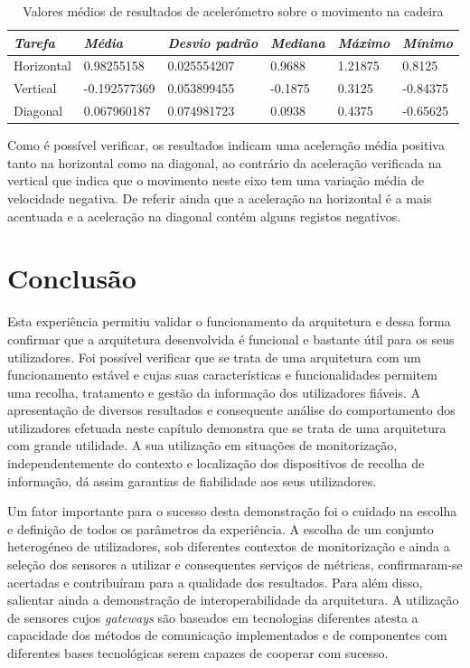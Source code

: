 {\renewcommand{\arraystretch}{1.0}
\begin{table}[!htb]
\centering
\label{tab:a_tbk}
\vspace{2pt}
\begin{tabular}{ | l | l | l | l | l | l |  }
\hline
\textit{Tarefa}&\textit{Média}&\textit{Desvio padrão}&\textit{Mediana} & \textit{Máximo} & \textit{Mínimo}\\  
\hline
Horizontal&0.98255158&0.025554207&0.9688&1.21875&0.8125 \\
Vertical&-0.192577369&0.053899455&-0.1875&0.3125&-0.84375 \\
Diagonal&0.067960187&0.074981723&0.0938&0.4375&-0.65625 \\
\hline
\end{tabular}
\caption{Valores médios de resultados de acelerómetro sobre o movimento na cadeira} 
\end{table}}

Como é possível verificar, os resultados indicam uma aceleração média positiva tanto na horizontal como na diagonal, ao contrário da aceleração verificada na vertical que indica que o movimento neste eixo tem uma variação média de velocidade negativa. De referir ainda que a aceleração na horizontal é a mais acentuada e a aceleração na diagonal contém alguns registos negativos.




\section{Conclusão}

Esta experiência permitiu validar o funcionamento da arquitetura e dessa forma confirmar que a arquitetura desenvolvida é funcional e bastante útil para os seus utilizadores. Foi possível verificar que se trata de uma arquitetura com um funcionamento estável e cujas suas características e funcionalidades permitem uma recolha, tratamento e gestão da informação dos utilizadores fiáveis. A apresentação de diversos resultados e consequente análise do comportamento dos utilizadores efetuada neste capítulo demonstra que se trata de uma arquitetura com grande utilidade. A sua utilização em situações de monitorização, independentemente do contexto e localização dos dispositivos de recolha de informação, dá assim garantias de fiabilidade aos seus utilizadores.

Um fator importante para o sucesso desta demonstração foi o cuidado na escolha e definição de todos os parâmetros da experiência. A escolha de um conjunto heterogéneo de utilizadores, sob diferentes contextos de monitorização e ainda a seleção dos sensores a utilizar e consequentes serviços de métricas, confirmaram-se acertadas e contribuíram para a qualidade dos resultados. Para além disso, salientar ainda a demonstração de interoperabilidade da arquitetura. A utilização de sensores cujos \textit{gateways} são baseados em tecnologias diferentes atesta a capacidade dos métodos de comunicação implementados e de componentes com diferentes bases tecnológicas serem capazes de cooperar com sucesso.

